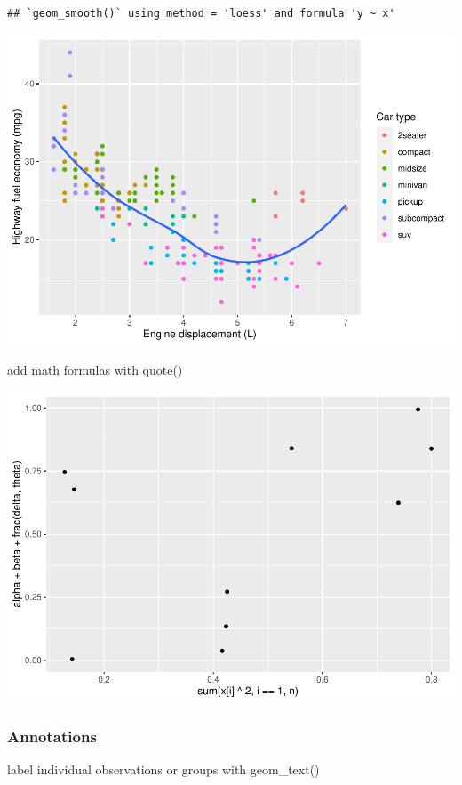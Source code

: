 \documentclass[
]{article}
\begin{document}
\begin{verbatim}
## `geom_smooth()` using method = 'loess' and formula 'y ~ x'
\end{verbatim}

\includegraphics{rmarkdown_tutorial_files/figure-latex/unnamed-chunk-13-1.pdf}

add math formulas with quote()

\includegraphics{rmarkdown_tutorial_files/figure-latex/unnamed-chunk-14-1.pdf}

\hypertarget{annotations}{%
\subsubsection{Annotations}\label{annotations}}

label individual observations or groups with geom\_text()
\end{document}
